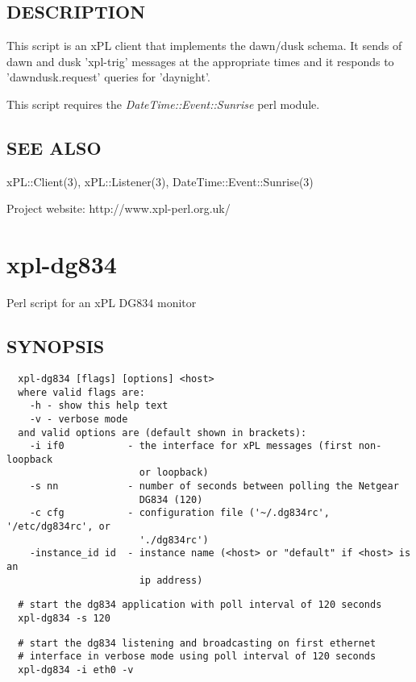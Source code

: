 \subsection*{DESCRIPTION\label{xpl-dawndusk_DESCRIPTION}}


This script is an xPL client that implements the dawn/dusk schema.
It sends of dawn and dusk 'xpl-trig' messages at the appropriate times
and it responds to 'dawndusk.request' queries for 'daynight'.



This script requires the \emph{DateTime::Event::Sunrise} perl module.

\subsection*{SEE ALSO\label{xpl-dawndusk_SEE_ALSO}}


xPL::Client(3), xPL::Listener(3), DateTime::Event::Sunrise(3)



Project website: http://www.xpl-perl.org.uk/

\section{xpl-dg834\label{xpl-dg834}}


Perl script for an xPL DG834 monitor

\subsection*{SYNOPSIS\label{xpl-dg834_SYNOPSIS}}
\begin{verbatim}
  xpl-dg834 [flags] [options] <host>
  where valid flags are:
    -h - show this help text
    -v - verbose mode
  and valid options are (default shown in brackets):
    -i if0           - the interface for xPL messages (first non-loopback
                       or loopback)
    -s nn            - number of seconds between polling the Netgear
                       DG834 (120)
    -c cfg           - configuration file ('~/.dg834rc', '/etc/dg834rc', or
                       './dg834rc')
    -instance_id id  - instance name (<host> or "default" if <host> is an
                       ip address)
\end{verbatim}
\begin{verbatim}
  # start the dg834 application with poll interval of 120 seconds
  xpl-dg834 -s 120
\end{verbatim}
\begin{verbatim}
  # start the dg834 listening and broadcasting on first ethernet
  # interface in verbose mode using poll interval of 120 seconds
  xpl-dg834 -i eth0 -v
\end{verbatim}
